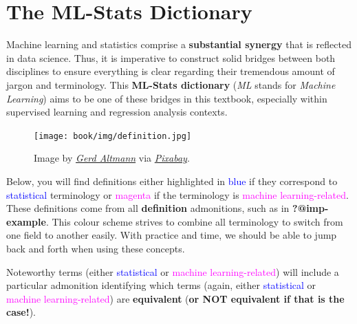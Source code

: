 \documentclass[
  letterpaper,
  DIV=11,
  numbers=noendperiod]{scrreprt}
\begin{document}
\cleardoublepage
{}
{}
\appendix

\chapter{The ML-Stats Dictionary}\label{sec-dictionary}

Machine learning and statistics comprise a \textbf{substantial synergy}
that is reflected in data science. Thus, it is imperative to construct
solid bridges between both disciplines to ensure everything is clear
regarding their tremendous amount of jargon and terminology. This
\textbf{ML-Stats dictionary} (\emph{ML} stands for \emph{Machine
Learning}) aims to be one of these bridges in this textbook, especially
within supervised learning and regression analysis contexts.

\begin{figure}[H]

{\centering \texttt{[image: book/img/definition.jpg]}

}

\caption{Image by
\href{https://pixabay.com/users/geralt-9301/}{\emph{Gerd Altmann}} via
\href{https://pixabay.com/photos/definition-books-library-bookshelf-4255486/}{\emph{Pixabay}}.}

\end{figure}%

Below, you will find definitions either highlighted in
\textcolor{blue}{blue} if they correspond to
\textcolor{blue}{statistical} terminology or
\textcolor{magenta}{magenta} if the terminology is
\textcolor{magenta}{machine learning-related}. These definitions come
from all \textbf{definition} admonitions, such as in
\textbf{?@imp-example}. This colour scheme strives to combine all
terminology to switch from one field to another easily. With practice
and time, we should be able to jump back and forth when using these
concepts.

\begin{tcolorbox}[enhanced jigsaw, bottomrule=.15mm, breakable, colback=white, leftrule=.75mm, coltitle=black, rightrule=.15mm, bottomtitle=1mm, title=\textcolor{quarto-callout-warning-color}{\faExclamationTriangle}\hspace{0.5em}{Attention!}, opacitybacktitle=0.6, toprule=.15mm, titlerule=0mm, arc=.35mm, colbacktitle=quarto-callout-warning-color!10!white, toptitle=1mm, colframe=quarto-callout-warning-color-frame, left=2mm, opacityback=0]

Noteworthy terms (either \textcolor{blue}{statistical} or
\textcolor{magenta}{machine learning-related}) will include a particular
admonition identifying which terms (again, either
\textcolor{blue}{statistical} or
\textcolor{magenta}{machine learning-related}) are \textbf{equivalent}
(\textbf{or NOT equivalent if that is the case!}).

\end{tcolorbox}
\end{document}
